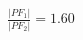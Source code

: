\documentclass[preview]{standalone}
\begin{document}
\begin{align*}
\frac{|PF_1|}{|PF_2|} = 1.60
\end{align*}
\end{document}
